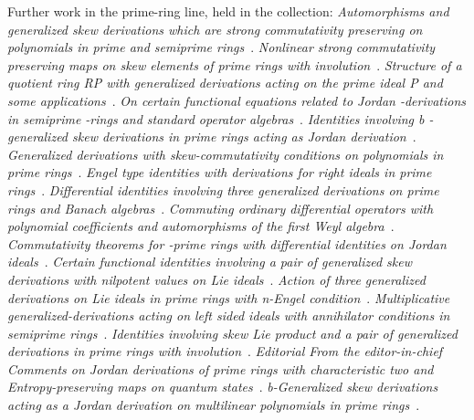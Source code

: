 Further work in the prime-ring line, held in the collection:
\noindent\emph{Automorphisms and generalized skew derivations which are strong commutativity preserving on polynomials in prime and semiprime rings}~\cite{LibAutomorphismsAndGeneralizedSkew2016}.
\noindent\emph{Nonlinear strong commutativity preserving maps on skew elements of prime rings with involution}~\cite{LibNonlinearStrongCommutativityPreser2012}.
\noindent\emph{Structure of a quotient ring RP with generalized derivations acting on the prime ideal P and some applications}~\cite{LibStructureOfAQuotient2021}.
\noindent\emph{On certain functional equations related to Jordan -derivations in semiprime -rings and standard operator algebras}~\cite{LibOnCertainFunctionalEquations2018}.
\noindent\emph{Identities involving b -generalized skew derivations in prime rings acting as Jordan derivation}~\cite{LibIdentitiesInvolvingBGeneralized2024}.
\noindent\emph{Generalized derivations with skew-commutativity conditions on polynomials in prime rings}~\cite{LibGeneralizedDerivationsWithSkew2019}.
\noindent\emph{Engel type identities with derivations for right ideals in prime rings}~\cite{LibEngelTypeIdentitiesWith2006}.
\noindent\emph{Differential identities involving three generalized derivations on prime rings and Banach algebras}~\cite{LibDifferentialIdentitiesInvolvingThr}.
\noindent\emph{Commuting ordinary differential operators with polynomial coefficients and automorphisms of the first Weyl algebra}~\cite{LibCommutingOrdinaryDifferentialOpera2016}.
\noindent\emph{Commutativity theorems for -prime rings with differential identities on Jordan ideals}~\cite{LibCommutativityTheoremsForPrime2012}.
\noindent\emph{Certain functional identities involving a pair of generalized skew derivations with nilpotent values on Lie ideals}~\cite{LibCertainFunctionalIdentitiesInvolvi2023}.
\noindent\emph{Action of three generalized derivations on Lie ideals in prime rings with n-Engel condition}~\cite{LibActionOfThreeGeneralized2026}.
\noindent\emph{Multiplicative generalized-derivations acting on left sided ideals with annihilator conditions in semiprime rings}~\cite{LibMultiplicativeGeneralizedDerivatio2024}.
\noindent\emph{Identities involving skew Lie product and a pair of generalized derivations in prime rings with involution}~\cite{LibIdentitiesInvolvingSkewLie2021}.
\noindent\emph{Editorial From the editor-in-chief Comments on Jordan derivations of prime rings with characteristic two and Entropy-preserving maps on quantum states}~\cite{LibEditorialFromTheEditor2017}.
\noindent\emph{b-Generalized skew derivations acting as a Jordan derivation on multilinear polynomials in prime rings}~\cite{LibBGeneralizedSkewDerivations2023}.
